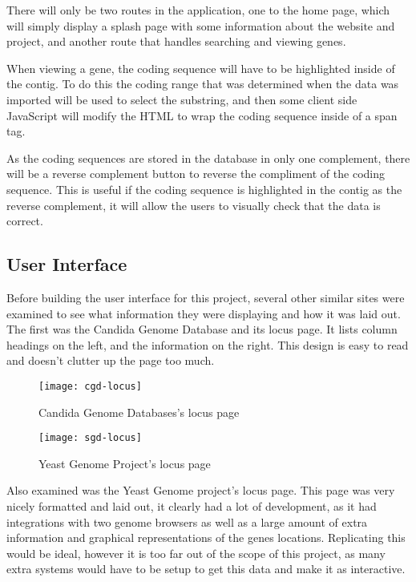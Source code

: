 There will only be two routes in the application, one to the home page, which will simply display a splash page with some information about the website and project, and another route that handles searching and viewing genes.

When viewing a gene, the coding sequence will have to be highlighted inside of the contig. To do this the coding range that was determined when the data was imported will be used to select the substring, and then some client side JavaScript will modify the HTML to wrap the coding sequence inside of a span tag. 

As the coding sequences are stored in the database in only one complement, there will be a reverse complement button to reverse the compliment of the coding sequence. This is useful if the coding sequence is highlighted in the contig as the reverse complement, it will allow the users to visually check that the data is correct. 

\subsection{User Interface}
Before building the user interface for this project, several other similar sites were examined to see what information they were displaying and how it was laid out. The first was the Candida Genome Database\cite{cgd} and its locus page. It lists column headings on the left, and the information on the right. This design is easy to read and doesn't clutter up the page too much.

\begin{figure}[H]
\begin{center}
\texttt{[image: cgd-locus]}
\caption{Candida Genome Databases's locus page}
\end{center}
\end{figure}


\begin{figure}[H]
\begin{center}
\texttt{[image: sgd-locus]}
\caption{Yeast Genome Project's locus page}
\end{center}
\end{figure}

Also examined was the Yeast Genome\cite{sgd} project's locus page. This page was very nicely formatted and laid out, it clearly had a lot of development, as it had integrations with two genome browsers as well as a large amount of extra information and graphical representations of the genes locations. Replicating this would be ideal, however it is too far out of the scope of this project, as many extra systems would have to be setup to get this data and make it as interactive.

